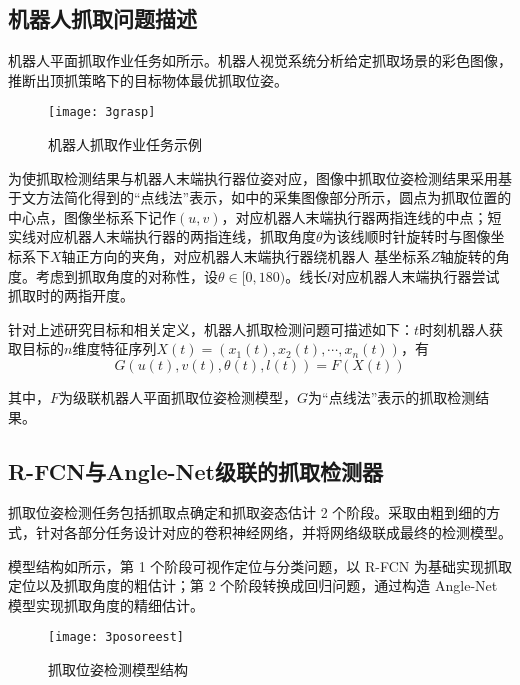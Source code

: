 \documentclass{hitszthesis}
\begin{document}
\subsection{机器人抓取问题描述}

机器人平面抓取作业任务如所示。机器人视觉系统分析给定抓取场景的彩色图像，推断出顶抓策略下的目标物体最优抓取位姿。

\begin{figure}[!htbp]
	\centering
	\texttt{[image: 3grasp]}
	\caption{机器人抓取作业任务示例}
     \label{figgrasp}
\end{figure}

为使抓取检测结果与机器人末端执行器位姿对应，图像中抓取位姿检测结果采用基于文\cite{bibb4}方法简化得到的“点线法”表示，如中的采集图像部分所示，圆点为抓取位置的中心点，图像坐标系下记作$(u, v)$，对应机器人末端执行器两指连线的中点；短实线对应机器人末端执行器的两指连线，抓取角度$\theta$为该线顺时针旋转时与图像坐标系下$X$轴正方向的夹角，对应机器人末端执行器绕机器人 基坐标系$Z$轴旋转的角度。考虑到抓取角度的对称性，设$\theta\in [0, 180)$。线长$l$对应机器人末端执行器尝试抓取时的两指开度。

针对上述研究目标和相关定义，机器人抓取检测问题可描述如下：$t$时刻机器人获取目标的$n$维度特征序列$X (t) = (x_1(t), x_2(t),\cdots, x_n(t))$，有
\begin{equation}
G(u(t), v(t), \theta(t), l(t)) = F(X (t))
\end{equation}

其中，$F$为级联机器人平面抓取位姿检测模型，$G$为“点线法”表示的抓取检测结果。

\subsection{R-FCN与Angle-Net级联的抓取检测器}

抓取位姿检测任务包括抓取点确定和抓取姿态估计 2 个阶段。采取由粗到细的方式，针对各部分任务设计对应的卷积神经网络，并将网络级联成最终的检测模型。

模型结构如所示，第 1 个阶段可视作定位与分类问题，以 R-FCN 为基础实现抓取定位以及抓取角度的粗估计；第 2 个阶段转换成回归问题，通过构造 Angle-Net 模型实现抓取角度的精细估计。

\begin{figure}[!htbp]
	\centering
	\texttt{[image: 3posoreest]}
	\caption{抓取位姿检测模型结构}
     \label{figpoe}
\end{figure}
\end{document}
